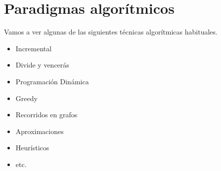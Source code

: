 \documentclass[AL.tex]{subfiles}
\begin{document}
\chapter{Paradigmas algorítmicos}

Vamos a ver algunas de las siguientes técnicas algorítmicas habituales.
\begin{itemize}
\item Incremental
\item Divide y vencerás
\item Programación Dinámica
\item Greedy
\item Recorridos en grafos
\item Aproximaciones
\item Heurísticos
\item etc.
\end{itemize}
\end{document}
